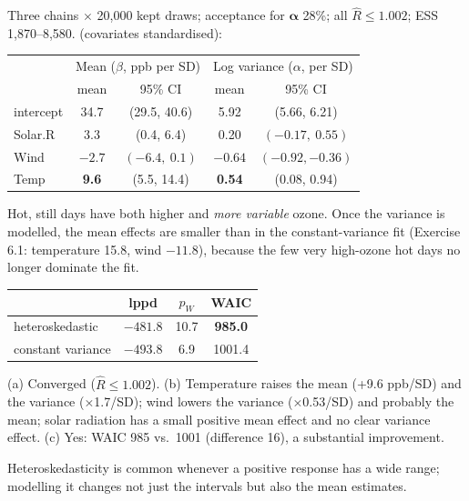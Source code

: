 \documentclass[11pt]{article}
\begin{document}
\solution
{} Three chains $\times$ 20{,}000 kept draws; acceptance for $\bm\alpha$ 28\%; all $\hat R\le1.002$; ESS 1{,}870--8{,}580.
 (covariates standardised):
\begin{center}
\small
\begin{tabular}{lcc|cc}\toprule
 & \multicolumn{2}{c|}{Mean ($\beta$, ppb per SD)} & \multicolumn{2}{c}{Log variance ($\alpha$, per SD)}\\
 & mean & 95\% CI & mean & 95\% CI\\\midrule
intercept & 34.7 & (29.5, 40.6) & 5.92 & (5.66, 6.21)\\
Solar.R & 3.3 & (0.4, 6.4) & 0.20 & $(-0.17,\ 0.55)$\\
Wind & $-2.7$ & $(-6.4,\ 0.1)$ & $\mathbf{-0.64}$ & $(-0.92,-0.36)$\\
Temp & \textbf{9.6} & (5.5, 14.4) & \textbf{0.54} & (0.08, 0.94)\\\bottomrule
\end{tabular}
\end{center}
Hot, still days have both higher and \emph{more variable} ozone. Once the variance is modelled, the mean effects are smaller than in the constant-variance fit (Exercise 6.1: temperature 15.8, wind $-11.8$), because the few very high-ozone hot days no longer dominate the fit.
\begin{center}
\begin{tabular}{lccc}\toprule
 & lppd & $p_W$ & WAIC\\\midrule
heteroskedastic & $-481.8$ & 10.7 & \textbf{985.0}\\
constant variance & $-493.8$ & 6.9 & 1001.4\\\bottomrule
\end{tabular}
\end{center}

\begin{answer}
(a) Converged ($\hat R\le1.002$). (b) Temperature raises the mean (+9.6 ppb/SD) and the variance (×1.7/SD); wind lowers the variance (×0.53/SD) and probably the mean; solar radiation has a small positive mean effect and no clear variance effect. (c) Yes: WAIC 985 vs.\ 1001 (difference 16), a substantial improvement.
\end{answer}

\begin{takeaway}
Heteroskedasticity is common whenever a positive response has a wide range; modelling it changes not just the intervals but also the mean estimates.
\end{takeaway}
\end{document}
